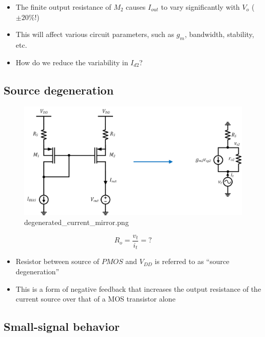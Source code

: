 \documentclass[11pt]{article}
\providecommand{\tightlist}{%
      \setlength{\itemsep}{0pt}\setlength{\parskip}{0pt}}
\begin{document}
    \begin{itemize}
\tightlist
\item
  The finite output resistance of \(M_2\) causes \(I_{out}\) to vary
  significantly with \(V_o\) (\(\pm20\%\)!)
\item
  This will affect various circuit parameters, such as \(g_m\),
  bandwidth, stability, etc.
\item
  How do we reduce the variability in \(I_{d2}\)?
\end{itemize}

    \hypertarget{source-degeneration}{%
\subsection{Source degeneration}\label{source-degeneration}}

    \begin{figure}
\centering
\includegraphics{degenerated_current_mirror.png}
\caption{degenerated\_current\_mirror.png}
\end{figure}

    \begin{equation}
R_o = \dfrac{v_t}{i_t} = ?
\end{equation}

    \begin{itemize}
\tightlist
\item
  Resistor between source of \(PMOS\) and \(V_{DD}\) is referred to as
  ``source degeneration''
\item
  This is a form of negative feedback that increases the output
  resistance of the current source over that of a MOS transistor alone
\end{itemize}

    \hypertarget{small-signal-behavior}{%
\subsection{Small-signal behavior}\label{small-signal-behavior}}
\end{document}
